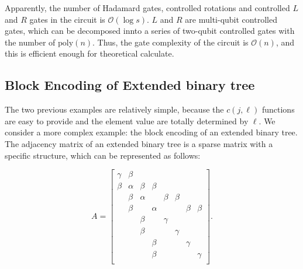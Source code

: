 \documentclass{article}
\begin{document}
Apparently, the number of Hadamard gates, controlled rotations and controlled $L$ and $R$ gates in the circuit is $\mathcal{O}(\log s)$. $L$ and $R$ are multi-qubit controlled gates, which can be decomposed innto a series of two-qubit controlled gates with the number of $\mathrm{poly}(n)$. Thus, the gate complexity of the circuit is $\mathcal{O}(n)$, and this is efficient enough for theoretical calculate.

\subsection{Block Encoding of Extended binary tree}

The two previous examples are relatively simple, because the $c(j, \ell)$ functions are easy to provide and the element value are totally determined by $\ell$. We consider a more complex example: the block encoding of an extended binary tree. The adjacency matrix of an extended binary tree is a sparse matrix with a specific structure, which can be represented as follows:

\begin{figure}[htbp]
  \centering
  \begin{minipage}{0.35\textwidth}
    \centering
  \end{minipage}
  \hfill
  \begin{minipage}{0.6\textwidth}
    \centering
    \begin{equation}
      A =
      \begin{bmatrix}
        \gamma & \beta \\
        \beta & \alpha & \beta & \beta \\
        & \beta & \alpha & & \beta & \beta \\
        & \beta & & \alpha & & & \beta & \beta  \\
        & & \beta & & \gamma \\
        & & \beta & & & \gamma \\
        & & & \beta & & & \gamma \\
        &       & & \beta  & & &       & \gamma \\
      \end{bmatrix}.
    \end{equation}
  \end{minipage}\label{fig:figure}
\end{figure}
\end{document}
